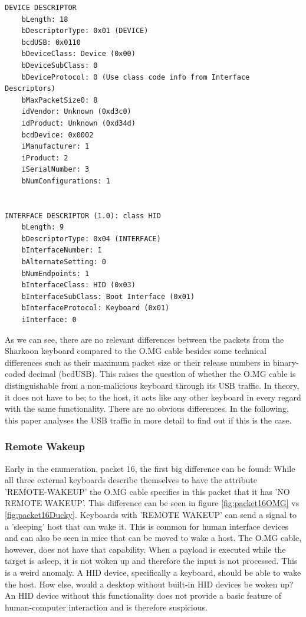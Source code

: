 \begin{lstlisting}[caption={Device and Interface Descriptor packet generated by an O.MG cable},captionpos=b]
DEVICE DESCRIPTOR
    bLength: 18
    bDescriptorType: 0x01 (DEVICE)
    bcdUSB: 0x0110
    bDeviceClass: Device (0x00)
    bDeviceSubClass: 0
    bDeviceProtocol: 0 (Use class code info from Interface Descriptors)
    bMaxPacketSize0: 8
    idVendor: Unknown (0xd3c0)
    idProduct: Unknown (0xd34d)
    bcdDevice: 0x0002
    iManufacturer: 1
    iProduct: 2
    iSerialNumber: 3
    bNumConfigurations: 1


INTERFACE DESCRIPTOR (1.0): class HID
    bLength: 9
    bDescriptorType: 0x04 (INTERFACE)
    bInterfaceNumber: 1
    bAlternateSetting: 0
    bNumEndpoints: 1
    bInterfaceClass: HID (0x03)
    bInterfaceSubClass: Boot Interface (0x01)
    bInterfaceProtocol: Keyboard (0x01)
    iInterface: 0
\end{lstlisting}

As we can see, there are no relevant differences between the packets from the Sharkoon keyboard compared to the O.MG cable besides some technical differences such as their maximum packet size or their release numbers in binary-coded decimal (bcdUSB). This raises the question of whether the O.MG cable is distinguishable
from a non-malicious keyboard through its USB traffic. In theory, it does not have to be; to the host, it acts like any other keyboard in every regard with the same functionality. There are no obvious differences. In the following, this paper analyses the USB traffic in more detail to find out if this is the case.


\subsubsection{Remote Wakeup}

Early in the enumeration, packet 16, the first big difference can be found: While all three external keyboards describe themselves to have the attribute 'REMOTE-WAKEUP' the O.MG cable specifies in this packet that it has 'NO REMOTE WAKEUP'. This difference can be seen in figure \ref{fig:packet16OMG} vs \ref{fig:packet16Ducky}. Keyboards with 'REMOTE WAKEUP' can send a signal to a 'sleeping' host that can wake it. This is common for human interface devices and can also be seen in mice that can be moved to wake a host. The O.MG cable, however, does not have that capability. When a payload is executed while the target is asleep, it is not woken up and therefore the input is not processed. This is a weird anomaly. A HID device, specifically a keyboard, should be able to wake the host. How else, would a desktop without built-in HID devices be woken up? An HID device without this functionality does not provide a basic feature of human-computer interaction and is therefore suspicious.

